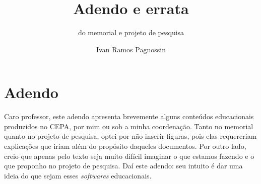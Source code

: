 \documentclass[a4paper,10pt]{scrartcl}					%
\title{Adendo e errata}
\subtitle{do memorial e projeto de pesquisa}
\author{Ivan Ramos Pagnossin}
\newcommand\foreign[1]{\textsl{#1}}
\begin{document}
	\maketitle

	\section{Adendo}

	Caro professor, este adendo apresenta brevemente alguns conteúdos educacionais produzidos no CEPA, por mim ou sob a minha coordenação. Tanto no memorial quanto no projeto de pesquisa, optei por não inserir figuras, pois elas requereriam explicações que iriam além do propósito daqueles documentos. Por outro lado, creio que apenas pelo texto seja muito difícil imaginar o que estamos fazendo e o que proponho no projeto de pesquisa. Daí este adendo: seu intuito é dar uma ideia do que sejam esses \foreign{softwares} educacionais.
	
\end{document}
